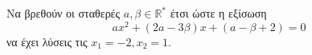 Να βρεθούν οι σταθερές $ a,\beta\in\mathbb{R}^* $ έτσι ώστε η εξίσωση
\[ ax^2+(2a-3\beta)x+(a-\beta+2)=0 \] 
να έχει λύσεις τις $ x_1=-2, x_2=1 $.
